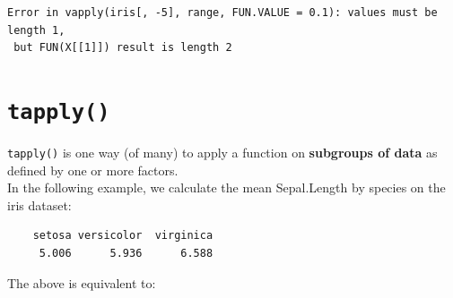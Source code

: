 \documentclass[
]{book}
\newenvironment{Shaded}{\begin{snugshade}}{\end{snugshade}}
\newcommand{\ControlFlowTok}[1]{\textcolor[rgb]{0.13,0.29,0.53}{\textbf{#1}}}
\newcommand{\FunctionTok}[1]{\textcolor[rgb]{0.00,0.00,0.00}{#1}}
\newcommand{\NormalTok}[1]{#1}
\newcommand{\OtherTok}[1]{\textcolor[rgb]{0.56,0.35,0.01}{#1}}
\newcommand{\SpecialCharTok}[1]{\textcolor[rgb]{0.00,0.00,0.00}{#1}}
\newcommand{\StringTok}[1]{\textcolor[rgb]{0.31,0.60,0.02}{#1}}
\begin{document}
\begin{verbatim}
Error in vapply(iris[, -5], range, FUN.VALUE = 0.1): values must be length 1,
 but FUN(X[[1]]) result is length 2
\end{verbatim}

\hypertarget{tapply}{%
\section{\texorpdfstring{\texttt{tapply()}}{tapply()}}\label{tapply}}

\texttt{tapply()} is one way (of many) to apply a function on \textbf{subgroups of data} as defined by one or more factors.\\
In the following example, we calculate the mean Sepal.Length by species on the iris dataset:

\begin{Shaded}
\end{Shaded}

\begin{verbatim}
    setosa versicolor  virginica 
     5.006      5.936      6.588 
\end{verbatim}

The above is equivalent to:

\begin{Shaded}
\end{Shaded}
\end{document}
